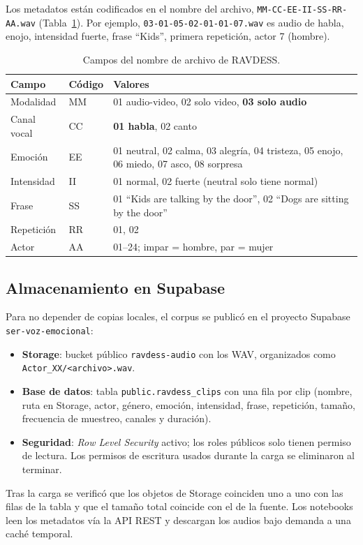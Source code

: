 \documentclass[11pt,a4paper]{article}
\begin{document}
Los metadatos están codificados en el nombre del archivo, \texttt{MM-CC-EE-II-SS-RR-AA.wav}
(Tabla~\ref{tab:codigo}). Por ejemplo, \texttt{03-01-05-02-01-01-07.wav} es audio de habla, enojo, intensidad
fuerte, frase ``Kids'', primera repetición, actor 7 (hombre).

\begin{table}[H]
\centering
\caption{Campos del nombre de archivo de RAVDESS.}
\label{tab:codigo}
\small
\begin{tabular}{@{}llp{8.2cm}@{}}
\toprule
Campo & Código & Valores \\
\midrule
Modalidad   & MM & 01 audio-video, 02 solo video, \textbf{03 solo audio} \\
Canal vocal & CC & \textbf{01 habla}, 02 canto \\
Emoción     & EE & 01 neutral, 02 calma, 03 alegría, 04 tristeza, 05 enojo, 06 miedo, 07 asco, 08 sorpresa \\
Intensidad  & II & 01 normal, 02 fuerte (neutral solo tiene normal) \\
Frase       & SS & 01 ``Kids are talking by the door'', 02 ``Dogs are sitting by the door'' \\
Repetición  & RR & 01, 02 \\
Actor       & AA & 01--24; impar = hombre, par = mujer \\
\bottomrule
\end{tabular}
\end{table}

\subsection{Almacenamiento en Supabase}

Para no depender de copias locales, el corpus se publicó en el proyecto Supabase
\texttt{ser-voz-emocional}:
\begin{itemize}
  \item \textbf{Storage}: bucket público \texttt{ravdess-audio} con los \nClips{} WAV, organizados como
        \texttt{Actor\_XX/<archivo>.wav}.
  \item \textbf{Base de datos}: tabla \texttt{public.ravdess\_clips} con una fila por clip (nombre, ruta en
        Storage, actor, género, emoción, intensidad, frase, repetición, tamaño, frecuencia de muestreo,
        canales y duración).
  \item \textbf{Seguridad}: \emph{Row Level Security} activo; los roles públicos solo tienen permiso de
        lectura. Los permisos de escritura usados durante la carga se eliminaron al terminar.
\end{itemize}
Tras la carga se verificó que los \nClips{} objetos de Storage coinciden uno a uno con las filas de la
tabla y que el tamaño total coincide con el de la fuente. Los notebooks leen los metadatos vía la API REST
y descargan los audios bajo demanda a una caché temporal.
\end{document}
